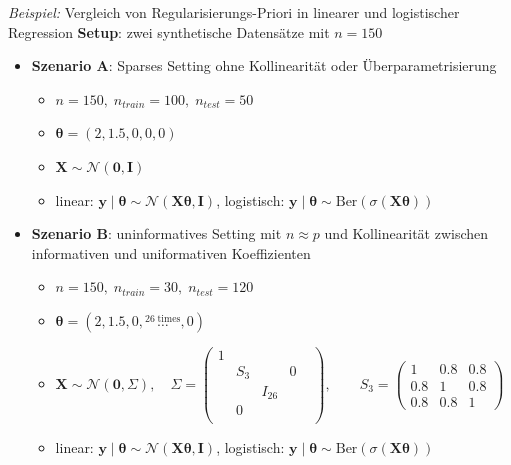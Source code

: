 \documentclass[
  ignorenonframetext,
  aspectratio=169,
]{beamer}
\providecommand{\tightlist}{%
  \setlength{\itemsep}{0pt}\setlength{\parskip}{0pt}}
\newcommand{\bnull}{\bm{0}}
\newcommand{\by}{\bm{y}}
\newcommand{\bI}{\bm{I}}
\newcommand{\bX}{\bm{X}}
\newcommand{\Ncal}{\mathcal{N}}
\newcommand{\Sd}{\Sigma}
\newcommand{\btheta}{\bm{\theta}}
\begin{document}
\begin{frame}{\emph{Beispiel:} Vergleich von Regularisierungs-Priori in
linearer und logistischer Regression}
\protect{}\label{beispiel-vergleich-von-regularisierungs-priori-in-linearer-und-logistischer-regression}
\textbf{Setup}: zwei synthetische Datensätze mit \(n=150\)

\begin{itemize}
\tightlist
\item
  \textbf{Szenario A}: Sparses Setting ohne Kollinearität oder
  Überparametrisierung

  \begin{itemize}
  \tightlist
  \item
    \(n = 150,\; n_{train} = 100,\;n_{test} = 50\)
  \item
    \(\btheta = (2, 1.5, 0, 0, 0)\)
  \item
    \(\bX \sim \Ncal(\bnull, \bI)\)
  \item
    linear: \(\by \mid \btheta \sim \Ncal(\bX \btheta,\bI)\),
    logistisch:
    \(\by \mid \btheta \sim \text{Ber}(\sigma(\bX \btheta))\)
  \end{itemize}
\item
  \textbf{Szenario B}: uninformatives Setting mit \(n \approx p\) und
  Kollinearität zwischen informativen und uniformativen Koeffizienten

  \begin{itemize}
  \tightlist
  \item
    \(n = 150,\; n_{train} = 30,\;n_{test} = 120\)
  \item
    \(\btheta = (2, 1.5, 0, \overset{26\; \text{times}}{\dots}, 0)\)
  \item
    \(\bX \sim \Ncal(\bnull, \Sd), \quad \Sd = \begin{pmatrix} 1 &        &         &        &        \\ & \!\!S_3\!\! &        & 0      &        \\ &        & I_{26} &        &        \\ & 0      &        &        &        \\ \end{pmatrix}, \qquad S_3 = \begin{pmatrix} 1   & 0.8 & 0.8\\ 0.8 & 1   & 0.8\\ 0.8 & 0.8 & 1 \end{pmatrix}\)
  \item
    linear: \(\by \mid \btheta \sim \Ncal(\bX \btheta, \bI)\),
    logistisch:
    \(\by \mid \btheta \sim \text{Ber}(\sigma(\bX \btheta))\)
  \end{itemize}
\end{itemize}
\end{frame}
\end{document}
